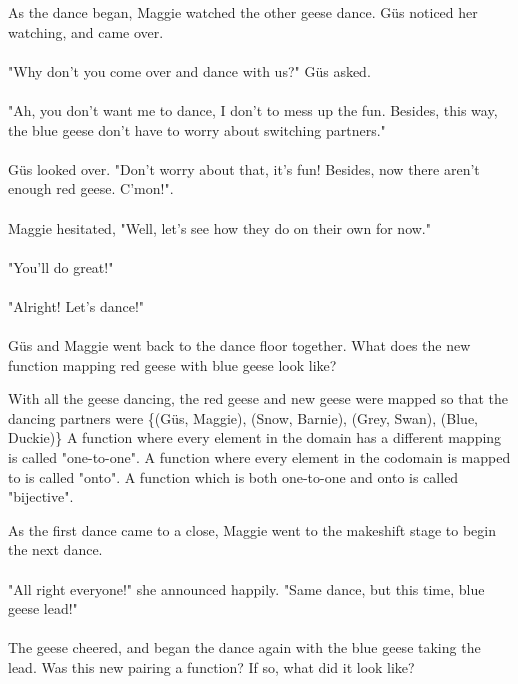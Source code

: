 {As the dance began, Maggie watched the other geese dance. G{\"u}s noticed her watching, and came over. 
\paragraph{} "Why don't you come over and dance with us?" G{\"u}s asked. 
\paragraph{} "Ah, you don't want me to dance, I don't to mess up the fun. Besides, this way, the blue geese don't have to worry about switching partners."
\paragraph{} G{\"u}s looked over. "Don't worry about that, it's fun! Besides, now there aren't enough red geese. C'mon!".
\paragraph{} Maggie hesitated, "Well, let's see how they do on their own for now."
\paragraph{} "You'll do great!"
\paragraph{} "Alright! Let's dance!" 
\paragraph{} G{\"u}s and Maggie went back to the dance floor together. 
What does the new function mapping red geese with blue geese look like?}
{With all the geese dancing, the red geese and new geese were mapped so that the dancing partners were \{(G{\"u}s, Maggie), (Snow, Barnie), (Grey, Swan), (Blue, Duckie)\}}
{A function where every element in the domain has a different mapping is called "one-to-one". A function where every element in the codomain is mapped to is called "onto". A function which is both one-to-one and onto is called "bijective".}
{}
{As the first dance came to a close, Maggie went to the makeshift stage to begin the next dance.  
\paragraph{} "All right everyone!" she announced happily. "Same dance, but this time, blue geese lead!" 
\paragraph{} The geese cheered, and began the dance again with the blue geese taking the lead. Was this new pairing a function? If so, what did it look like?}
